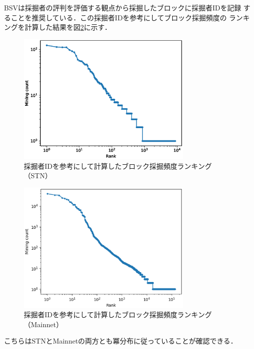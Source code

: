 \documentclass[graybox]{svmult}
\begin{document}
BSVは採掘者の評判を評価する観点から採掘したブロックに採掘者IDを記録
することを推奨している．この採掘者IDを参考にしてブロック採掘頻度の
ランキングを計算した結果を図\ref{fig:minerrank}に示す．
%
\begin{figure}[t]
  \vspace{-45mm}
  \begin{center}
    \includegraphics[width=85mm]{bsv_stn-block_miners-ranking-loglog.eps}
  \end{center}
  \vspace{45mm}
  \caption{採掘者IDを参考にして計算したブロック採掘頻度ランキング（STN）}
  \label{fig:minerrank}
\end{figure}
%
%
\begin{figure}[t]
  \begin{center}
    \includegraphics[width=85mm]{bsv_mainnet-block_miners-ranking-loglog.eps}
  \end{center}
  \caption{採掘者IDを参考にして計算したブロック採掘頻度ランキング（Mainnet）}
  \label{fig:minerrank}
\end{figure}
%

こちらはSTNとMainnetの両方とも冪分布に従っていることが確認できる．
\end{document}
